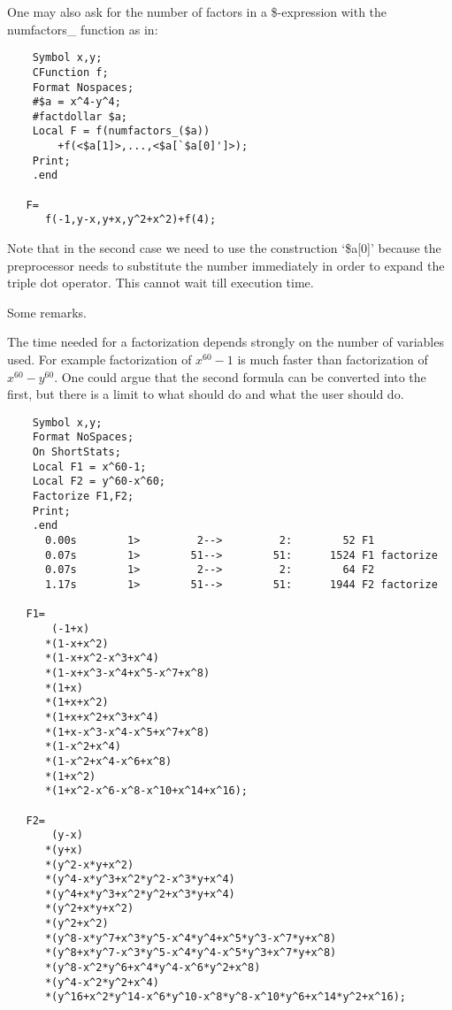 \noindent One may also ask for the number of factors in a \$-expression 
with the numfactors\_ function as in:
\begin{verbatim}
    Symbol x,y;
    CFunction f;
    Format Nospaces;
    #$a = x^4-y^4;
    #factdollar $a;
    Local F = f(numfactors_($a))
        +f(<$a[1]>,...,<$a[`$a[0]']>);
    Print;
    .end

   F=
      f(-1,y-x,y+x,y^2+x^2)+f(4);
\end{verbatim}
\noindent Note that in the second case we need to use the construction 
`\$a[0]' because the preprocessor needs to substitute the number 
immediately in order to expand the triple dot operator. This cannot wait 
till execution time.

\noindent Some remarks.

\noindent The time needed for a factorization depends strongly on the 
number of variables used. For example factorization of $x^{60}-1$ is much 
faster than factorization of $x^{60}-y^{60}$. One could argue that the 
second formula can be converted into the first, but there is a limit to 
what \FORM{} should do and what the user should do.
\begin{verbatim}
    Symbol x,y;
    Format NoSpaces;
    On ShortStats;
    Local F1 = x^60-1;
    Local F2 = y^60-x^60;
    Factorize F1,F2;
    Print;
    .end
      0.00s        1>         2-->         2:        52 F1 
      0.07s        1>        51-->        51:      1524 F1 factorize
      0.07s        1>         2-->         2:        64 F2 
      1.17s        1>        51-->        51:      1944 F2 factorize

   F1=
       (-1+x)
      *(1-x+x^2)
      *(1-x+x^2-x^3+x^4)
      *(1-x+x^3-x^4+x^5-x^7+x^8)
      *(1+x)
      *(1+x+x^2)
      *(1+x+x^2+x^3+x^4)
      *(1+x-x^3-x^4-x^5+x^7+x^8)
      *(1-x^2+x^4)
      *(1-x^2+x^4-x^6+x^8)
      *(1+x^2)
      *(1+x^2-x^6-x^8-x^10+x^14+x^16);

   F2=
       (y-x)
      *(y+x)
      *(y^2-x*y+x^2)
      *(y^4-x*y^3+x^2*y^2-x^3*y+x^4)
      *(y^4+x*y^3+x^2*y^2+x^3*y+x^4)
      *(y^2+x*y+x^2)
      *(y^2+x^2)
      *(y^8-x*y^7+x^3*y^5-x^4*y^4+x^5*y^3-x^7*y+x^8)
      *(y^8+x*y^7-x^3*y^5-x^4*y^4-x^5*y^3+x^7*y+x^8)
      *(y^8-x^2*y^6+x^4*y^4-x^6*y^2+x^8)
      *(y^4-x^2*y^2+x^4)
      *(y^16+x^2*y^14-x^6*y^10-x^8*y^8-x^10*y^6+x^14*y^2+x^16);
\end{verbatim}

